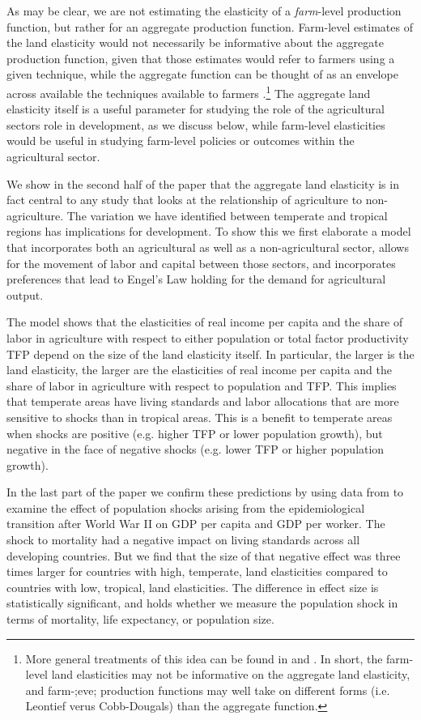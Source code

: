 \documentclass[11pt]{article}
\begin{document}
As may be clear, we are not estimating the elasticity of a \textit{farm}-level production function, but rather for an aggregate production function. Farm-level estimates of the land elasticity would not necessarily be informative about the aggregate production function, given that those estimates would refer to farmers using a given technique, while the aggregate function can be thought of as an envelope across available the techniques available to farmers \citep{Hayami:1970ly}.\footnote{More general treatments of this idea can be found in \citet{houthakker1955} and \citet{jones2005}. In short, the farm-level land elasticities may not be informative on the aggregate land elasticity, and farm-;eve; production functions may well take on different forms (i.e. Leontief verus Cobb-Dougals) than the aggregate function.} The aggregate land elasticity itself is a useful parameter for studying the role of the agricultural sectors role in development, as we discuss below, while farm-level elasticities would be useful in studying farm-level policies or outcomes within the agricultural sector.

We show in the second half of the paper that the aggregate land elasticity is in fact central to any study that looks at the relationship of agriculture to non-agriculture. The variation we have identified between temperate and tropical regions has implications for development. To show this we first elaborate a model that incorporates both an agricultural as well as a non-agricultural sector, allows for the movement of labor and capital between those sectors, and incorporates preferences that lead to Engel's Law holding for the demand for agricultural output. 

The model shows that the elasticities of real income per capita and the share of labor in agriculture with respect to either population or total factor productivity TFP depend on the size of the land elasticity itself. In particular, the larger is the land elasticity, the larger are the elasticities of real income per capita and the share of labor in agriculture with respect to population and TFP. This implies that temperate areas have living standards and labor allocations that are more sensitive to shocks than in tropical areas. This is a benefit to temperate areas when shocks are positive (e.g. higher TFP or lower population growth), but negative in the face of negative shocks (e.g. lower TFP or higher population growth).

In the last part of the paper we confirm these predictions by using data from \cite{aj07} to examine the effect of population shocks arising from the epidemiological transition after World War II on GDP per capita and GDP per worker. The shock to mortality had a negative impact on living standards across all developing countries. But we find that the size of that negative effect was three times larger for countries with high, temperate, land elasticities compared to countries with low, tropical, land elasticities. The difference in effect size is statistically significant, and holds whether we measure the population shock in terms of mortality, life expectancy, or population size.
\end{document}
